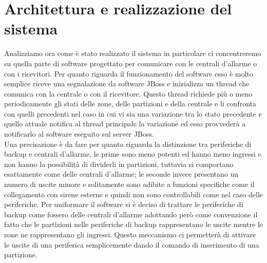 \section{Architettura e realizzazione del sistema}
Analizziamo ora come è stato realizzato il sistema in particolare ci concentreremo su quella parte di software progettato per comunicare con le centrali d'allarme o con i ricevitori. Per quanto riguarda il funzionamento del software esso è molto semplice riceve una segnalazione da software JBoss e inizializza un thread che comunica con la centrale o con il ricevitore. Questo thread richiede più o meno periodicamente gli stati delle zone, delle partizioni e della centrale e li confronta con quelli precedenti nel caso in cui  vi sia una variazione tra lo stato precedente e quello attuale notifica al thread principale la variazione ed esso provvederà a notificarlo al software eseguito sul server JBoss.\\
Una precisazione è da fare per quanto riguarda la distinzione tra periferiche di backup e centrali d'allarme, le prime sono meno potenti ed hanno meno ingressi e non hanno la possibilità di dividerli in partizioni, tuttavia si comportano esattamente come delle centrali d'allarme; le seconde invece presentano un numero di uscite minore e solitamente sono adibite a funzioni specifiche come il collegamento con sirene esterne e quindi non sono controllabili come nel caso delle periferiche. Per uniformare il software si è deciso di trattare le periferiche di backup come fossero delle centrali d'allarme adottando però come convenzione il fatto che le partizioni nelle periferiche di backup rappresentano le uscite mentre le zone ne rappresentano gli ingressi. Questo meccanismo ci permetterà di attivare le uscite di una periferica semplicemente dando il comando di inserimento di una partizione. 
